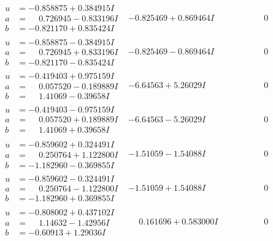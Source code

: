 \documentclass[1p]{elsarticle_modified}
\theoremstyle{definition}
\begin{document}
$$\begin{array}{c|c|c}
\begin{aligned}
u &= -0.858875 + 0.384915 I \\
a &= \phantom{-}0.726945 - 0.833196 I \\
b &= -0.821170 + 0.835424 I\end{aligned}
 & -0.825469 + 0.869464 I & \phantom{-0.000000 } 0 \\ \hline\begin{aligned}
u &= -0.858875 - 0.384915 I \\
a &= \phantom{-}0.726945 + 0.833196 I \\
b &= -0.821170 - 0.835424 I\end{aligned}
 & -0.825469 - 0.869464 I & \phantom{-0.000000 } 0 \\ \hline\begin{aligned}
u &= -0.419403 + 0.975159 I \\
a &= \phantom{-}0.057520 - 0.189889 I \\
b &= \phantom{-}1.41069 - 0.39658 I\end{aligned}
 & -6.64563 + 5.26029 I & \phantom{-0.000000 } 0 \\ \hline\begin{aligned}
u &= -0.419403 - 0.975159 I \\
a &= \phantom{-}0.057520 + 0.189889 I \\
b &= \phantom{-}1.41069 + 0.39658 I\end{aligned}
 & -6.64563 - 5.26029 I & \phantom{-0.000000 } 0 \\ \hline\begin{aligned}
u &= -0.859602 + 0.324491 I \\
a &= \phantom{-}0.250764 + 1.122800 I \\
b &= -1.182960 - 0.369855 I\end{aligned}
 & -1.51059 - 1.54088 I & \phantom{-0.000000 } 0 \\ \hline\begin{aligned}
u &= -0.859602 - 0.324491 I \\
a &= \phantom{-}0.250764 - 1.122800 I \\
b &= -1.182960 + 0.369855 I\end{aligned}
 & -1.51059 + 1.54088 I & \phantom{-0.000000 } 0 \\ \hline\begin{aligned}
u &= -0.808002 + 0.437102 I \\
a &= \phantom{-}1.14632 - 1.42956 I \\
b &= -0.60913 + 1.29036 I\end{aligned}
 & \phantom{-}0.161696 + 0.583000 I & \phantom{-0.000000 } 0 \\ \hline\begin{aligned}

\end{aligned}
\end{array}$$
\end{document}
